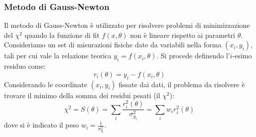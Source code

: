 \documentclass[openany,a4paper,12pt]{book}
\theoremstyle{remark}
\begin{document}
\subsubsection*{Metodo di Gauss-Newton}
Il metodo di Gauss-Newton è utilizzato per risolvere problemi di minimizzazione del $\chi^2$ quando la funzione di fit $f(x, \theta)$ non è lineare rispetto ai parametri $\theta$. 
Consideriamo un set di misurazioni fisiche date da variabili nella forma $(x_i, y_i)$, tali per cui vale la relazione teorica $y_i = f(x_i, \theta)$. Si procede definendo l'$i$-esimo residuo come:
\begin{equation}
    r_i(\theta) = y_i - f(x_i, \theta)
\end{equation}
Considerando le coordinate $(x_i, y_i)$ fissate dai dati, il problema da risolvere è trovare il minimo della somma dei residui pesati (il $\chi^2$):
\begin{equation*}
    \chi^2 = S(\theta) = \sum_{i} \frac{r_i^2(\theta)}{\sigma_{y_i}^2} = \sum_{i} w_i r_i^2(\theta)
\end{equation*}
dove si è indicato il peso $w_i = \frac{1}{\sigma_{y_i}^2}$.
\end{document}
